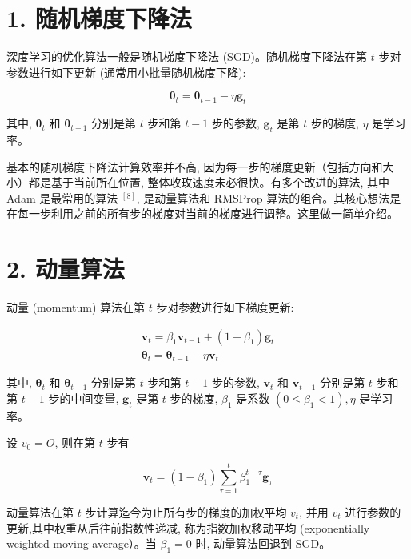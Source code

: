 \documentclass[10pt]{article}
\begin{document}
\section*{1. 随机梯度下降法}
深度学习的优化算法一般是随机梯度下降法 (SGD)。随机梯度下降法在第 $t$ 步对参数进行如下更新 (通常用小批量随机梯度下降):


\begin{equation*}
\boldsymbol{\theta}_{t}=\boldsymbol{\theta}_{t-1}-\eta \boldsymbol{g}_{t} \tag{29.1}
\end{equation*}


其中, $\boldsymbol{\theta}_{t}$ 和 $\boldsymbol{\theta}_{t-1}$ 分别是第 $t$ 步和第 $t-1$ 步的参数, $\boldsymbol{g}_{t}$ 是第 $t$ 步的梯度, $\eta$ 是学习率。

基本的随机梯度下降法计算效率并不高, 因为每一步的梯度更新（包括方向和大小）都是基于当前所在位置, 整体收玫速度未必很快。有多个改进的算法, 其中 Adam 是最常用的算法 ${ }^{[8]}$, 是动量算法和 RMSProp 算法的组合。其核心想法是在每一步利用之前的所有步的梯度对当前的梯度进行调整。这里做一简单介绍。

\section*{2. 动量算法}
动量 (momentum) 算法在第 $t$ 步对参数进行如下梯度更新:


\begin{gather*}
\boldsymbol{v}_{t}=\beta_{1} \boldsymbol{v}_{t-1}+\left(1-\beta_{1}\right) \boldsymbol{g}_{t}  \tag{29.2}\\
\boldsymbol{\theta}_{t}=\boldsymbol{\theta}_{t-1}-\eta \boldsymbol{v}_{t} \tag{29.3}
\end{gather*}


其中, $\boldsymbol{\theta}_{t}$ 和 $\boldsymbol{\theta}_{t-1}$ 分别是第 $t$ 步和第 $t-1$ 步的参数, $\boldsymbol{v}_{t}$ 和 $\boldsymbol{v}_{t-1}$ 分别是第 $t$ 步和第 $t-1$ 步的中间变量, $\boldsymbol{g}_{t}$ 是第 $t$ 步的梯度, $\beta_{1}$ 是系数 $\left(0 \leqslant \beta_{1}<1\right), \eta$ 是学习率。

设 $v_{0}=O$, 则在第 $t$ 步有


\begin{equation*}
\boldsymbol{v}_{t}=\left(1-\beta_{1}\right) \sum_{\tau=1}^{t} \beta_{1}^{t-\tau} \boldsymbol{g}_{\tau} \tag{29.4}
\end{equation*}


动量算法在第 $t$ 步计算迄今为止所有步的梯度的加权平均 $v_{t}$, 并用 $v_{t}$ 进行参数的更新,其中权重从后往前指数性递减, 称为指数加权移动平均 (exponentially weighted moving average）。当 $\beta_{1}=0$ 时, 动量算法回退到 SGD。
\end{document}
